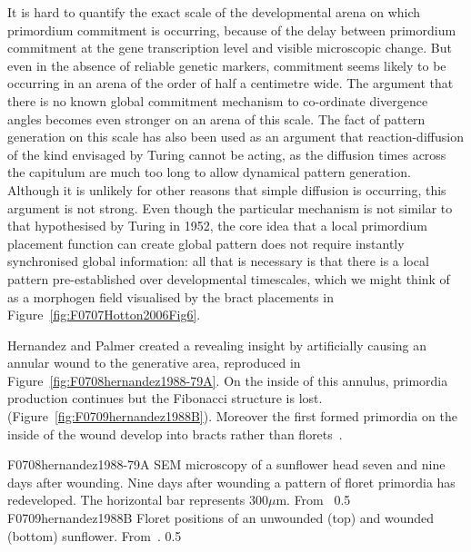 It is hard to quantify the exact scale of the developmental arena on which primordium commitment is occurring, because of the delay between primordium commitment at the gene transcription level and visible microscopic change. But even in the absence of reliable genetic markers, commitment seems likely to be occurring in an arena of the order of half a centimetre wide. The  argument that there is no known global commitment mechanism to co-ordinate divergence angles becomes even stronger on an arena of this scale.    The fact of pattern generation on this scale has also been used as an argument that reaction-diffusion of the kind envisaged by Turing cannot be acting, as the diffusion times across the capitulum are much too long to allow dynamical pattern generation. Although it is unlikely for other reasons that simple diffusion is occurring, this argument is not strong.   Even though the particular mechanism is not similar to that hypothesised by Turing in 1952, the core idea that a local primordium placement function can create global pattern does not require instantly synchronised global information: all that is necessary is that there is a local pattern pre-established over developmental timescales, which we might think of as a morphogen field visualised by the bract placements in Figure~\ref{fig:F0707Hotton2006Fig6}. 
 



Hernandez and Palmer created a  revealing insight by artificially causing an annular wound to the generative area, reproduced in Figure~\ref{fig:F0708hernandez1988-79A}\autocite{hernandezRegenerationSunflowerCapitulum1988}. On the inside of this annulus, primordia production continues but the Fibonacci structure is lost. (Figure~\ref{fig:F0709hernandez1988B}). Moreover the first formed primordia on the inside of the wound develop into bracts rather than florets~\autocite{hernandezRegenerationSunflowerCapitulum1988}.%

\jpgfig%
{F0708hernandez1988-79A}%
{
	SEM microscopy of a sunflower head seven and nine days after wounding. Nine days after wounding a pattern of floret primordia has redeveloped. 
	The horizontal bar represents $300\mu${}m. 
	From~\autocite{hernandezRegenerationSunflowerCapitulum1988}
}%
{0.5}%
\jpgfig%
{F0709hernandez1988B}%
{Floret positions of an unwounded (top) and wounded (bottom) sunflower. From~\autocite{hernandezRegenerationSunflowerCapitulum1988}.}%
{0.5}%

